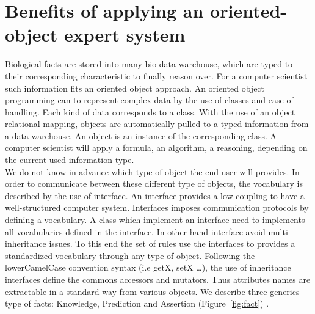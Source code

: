 \documentclass{llncs}
\begin{document}
\section{Benefits of applying an oriented-object expert system}
Biological facts are stored into many bio-data warehouse, which are typed to their corresponding characteristic to finally reason over. For a computer scientist such information fits an oriented object approach. An oriented object programming can to represent complex data by the use of classes and ease of handling. Each kind of data corresponds to a class. With the use of an object relational mapping, objects are automatically pulled to a typed information from a data warehouse. An object is an instance of the corresponding class. A computer scientist will apply a formula, an algorithm, a reasoning, depending on the current used information type. \\
We do not know in advance which type of object the end user will provides. In order to communicate between these different type of objects, the vocabulary is described by the use of interface. An interface provides a low coupling to have a well-structured computer system. Interfaces imposes communication protocols by defining a vocabulary. A class which implement an interface need to implements all vocabularies defined in the interface. In other hand interface avoid multi-inheritance issues. To this end the set of rules use the interfaces to provides a standardized vocabulary through any type of object. Following the lowerCamelCase convention syntax (i.e getX, setX \dots), the use of inheritance interfaces define the commons accessors and mutators. Thus attributes names are extractable in a standard way from various objects. We describe three generics type of facts: Knowledge, Prediction and Assertion (Figure~\ref{fig:fact}) .
\end{document}
